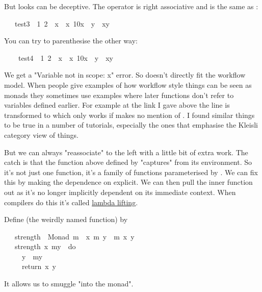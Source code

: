 \documentclass[12pt]{article}
\begin{document}
But looks can be deceptive. The operator  is right associative and  is the same as :
\begin{tabbing}\ttfamily
~~~test3~~1~2~~x~~x~10x~~y~~xy
\end{tabbing}
You can try to parenthesise the other way:
\begin{tabbing}\ttfamily
~~~~test4~~1~2~~x~~x~10x~~y~~xy
\end{tabbing}
We get a "Variable not in scope: x" error. So  doesn't directly fit the workflow model. When
people give examples of how workflow style things can be seen as monads they sometimes use
examples where later functions don't refer to variables defined earlier. For example at the link I
gave above the line  is transformed to  which
only works if  makes no mention of . I found similar things to be true in a number of tutorials,
especially the ones that emphasise the Kleisli category view of things.

But we can always "reassociate" to the left with a little bit of extra work.  The catch is that the
function above defined by  "captures"  from its environment.  So it's not just one
function, it's a family of functions parameterised by .  We can fix this by making the dependence
on  explicit.  We can then pull the inner function out as it's no longer implicitly dependent on
its immediate context.  When compilers do this it's called \href{https://en.wikipedia.org/wiki/Lambda_lifting}{lambda lifting}.

Define (the weirdly named function)  by
\begin{tabbing}\ttfamily
~~~strength~~Monad~m~~x~m~y~~m~x~y\\
\ttfamily ~~~strength~x~my~~do\\
\ttfamily ~~~~~y~~my\\
\ttfamily ~~~~~return~x~y
\end{tabbing}
It allows us to smuggle  "into the monad".
\end{document}

